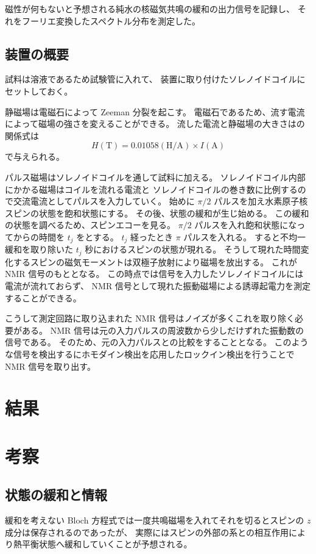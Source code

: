 \documentclass[11pt,dvipdfmx,a4paper]{jsarticle}
\begin{document}
磁性が何もないと予想される純水の核磁気共鳴の緩和の出力信号を記録し、
それをフーリエ変換したスペクトル分布を測定した。

\subsection{装置の概要}
試料は溶液であるため試験管に入れて、
装置に取り付けたソレノイドコイルにセットしておく。

静磁場は電磁石によって Zeeman 分裂を起こす。
電磁石であるため、流す電流によって磁場の強さを変えることができる。
流した電流と静磁場の大きさはの関係式は
\begin{equation}
	H (\text{T}) = 0.01058 (\text{H/A}) \times I (\text{A})
\end{equation}
で与えられる。

パルス磁場はソレノイドコイルを通して試料に加える。
ソレノイドコイル内部にかかる磁場はコイルを流れる電流と
ソレノイドコイルの巻き数に比例するので交流電流としてパルスを入力していく。
始めに \(\pi/2\) パルスを加え水素原子核スピンの状態を飽和状態にする。
その後、状態の緩和が生じ始める。
この緩和の状態を調べるため、スピンエコーを見る。
\(\pi/2\) パルスを入れ飽和状態になってからの時間を \(t_j\) をとする。
\(t_j\) 経ったとき \(\pi\) パルスを入れる。
すると不均一緩和を取り除いた \(t_j\) 秒におけるスピンの状態が現れる。
そうして現れた時間変化するスピンの磁気モーメントは双極子放射により磁場を放出する。
これが NMR 信号のもととなる。
この時点では信号を入力したソレノイドコイルには電流が流れておらず、
NMR 信号として現れた振動磁場による誘導起電力を測定することができる。

こうして測定回路に取り込まれた NMR 信号はノイズが多くこれを取り除く必要がある。
NMR 信号は元の入力パルスの周波数から少しだけずれた振動数の信号である。
そのため、元の入力パルスとの比較をすることとなる。
このような信号を検出するにホモダイン検出を応用したロックイン検出を行うことで NMR 信号を取り出す。

\section{結果}

\section{考察}
\subsection{状態の緩和と情報}
緩和を考えない Bloch 方程式では一度共鳴磁場を入れてそれを切るとスピンの \(z\) 成分は保存されるのであったが、
実際にはスピンの外部の系との相互作用により熱平衡状態へ緩和していくことが予想される。
\end{document}
